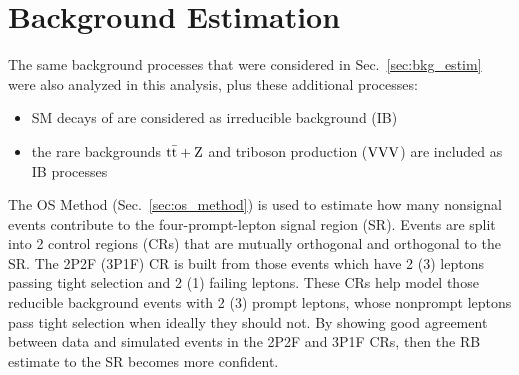 \section{Background Estimation}
\label{sec:bkg_estim_dilep}
The same background processes that were considered in Sec.~\ref{sec:bkg_estim} were also analyzed in this analysis, plus these additional processes:
\begin{itemize}
    \item SM decays of \htofourl are considered as irreducible background (IB)
    \item the rare backgrounds $\mathrm{t} \bar{\mathrm{t}} + \text{Z}$ and triboson production ($\mathrm{V}\mathrm{V}\mathrm{V}$) are included as IB processes
\end{itemize}

The OS Method (Sec.~\ref{sec:os_method}) is used to estimate how many nonsignal events contribute to the four-prompt-lepton signal region (SR).
Events are split into 2 control regions (CRs) that are mutually orthogonal and orthogonal to the SR.
The 2P2F (3P1F) CR is built from those events which have 2 (3) leptons passing tight selection and 2 (1) failing leptons.
These CRs help model those reducible background events with 2 (3) prompt leptons, whose nonprompt leptons pass tight selection when ideally they should not.
By showing good agreement between data and simulated events in the 2P2F and 3P1F CRs, then the RB estimate to the SR becomes more confident.

